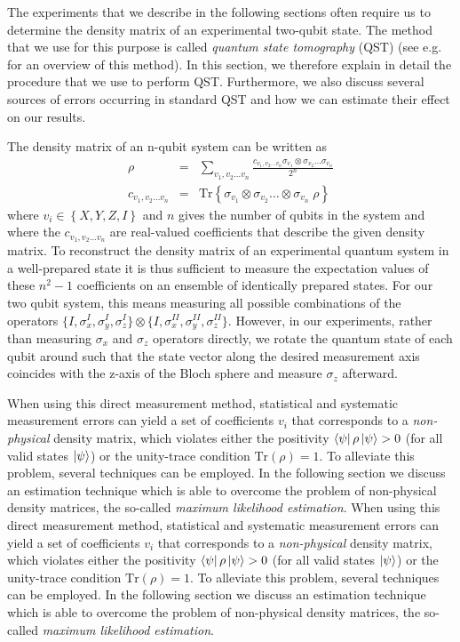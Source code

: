 The experiments that we describe in the following sections often require us to determine the density matrix of an experimental two-qubit state. The method that we use for this purpose is called {\it quantum state tomography} (QST) (see e.g. \cite{nielsen_quantum_2000} for an overview of this method). In this section, we therefore explain in detail the procedure that we use to perform QST. Furthermore, we also discuss several sources of errors occurring in standard QST and how we can estimate their effect on our results.

\smallskip

The density matrix of an n-qubit system can be written as
%
\begin{eqnarray}
\rho & = & \sum\limits_{v_1,v_2\hdots v_n} \frac{c_{v_1,v_2\hdots v_n} \sigma_{v_1}\otimes \sigma_{v_2}\hdots \sigma_{v_n}}{2^n} \label{eq:state_tomography_state_representation} \\
c_{v_1,v_2\hdots v_n} & = & \mathrm{Tr}\left\{\sigma_{v_1}\otimes \sigma_{v_2}\hdots \otimes\sigma_{v_n} \; \rho \right\} \label{eq:state_tomography_coefficients}
\end{eqnarray}
%
where $v_i \in \left\{ X,Y,Z,I\right\}$ and $n$ gives the number of qubits in the system and where the $c_{v_1,v_2\hdots v_n}$ are real-valued coefficients that describe the given density matrix. To reconstruct the density matrix of an experimental quantum system in a well-prepared state it is thus sufficient to measure the expectation values of these $n^2-1$ coefficients on an ensemble of identically prepared states. For our two qubit system, this means measuring all possible combinations of the operators $\{I,\sigma_x^I,\sigma_y^I,\sigma_z^I\}\otimes\{I,\sigma_x^{II},\sigma_y^{II},\sigma_z^{II}\}$. However, in our experiments, rather than measuring $\sigma_x$ and $\sigma_z$ operators directly, we rotate the quantum state of each qubit around such that the state vector along the desired measurement axis coincides with the z-axis of the Bloch sphere and measure $\sigma_z$ afterward.

When using this direct measurement method, statistical and systematic measurement errors can yield a set of coefficients $v_i$ that corresponds to a {\it non-physical} density matrix, which violates either the positivity $\left< \psi \right|\rho\left| \psi \right> > 0$ (for all valid states $\left| \psi \right>$) or the unity-trace condition $\mathrm{Tr}(\rho)=1$. To alleviate this problem, several techniques can be employed. In the following section we discuss an estimation technique which is able to overcome the problem of non-physical density matrices, the so-called {\it maximum likelihood estimation}.
When using this direct measurement method, statistical and systematic measurement errors can yield a set of coefficients $v_i$ that corresponds to a {\it non-physical} density matrix, which violates either the positivity $\left< \psi \right|\rho\left| \psi \right> > 0$ (for all valid states $\left| \psi \right>$) or the unity-trace condition $\mathrm{Tr}(\rho)=1$. To alleviate this problem, several techniques can be employed. In the following section we discuss an estimation technique which is able to overcome the problem of non-physical density matrices, the so-called {\it maximum likelihood estimation}.

